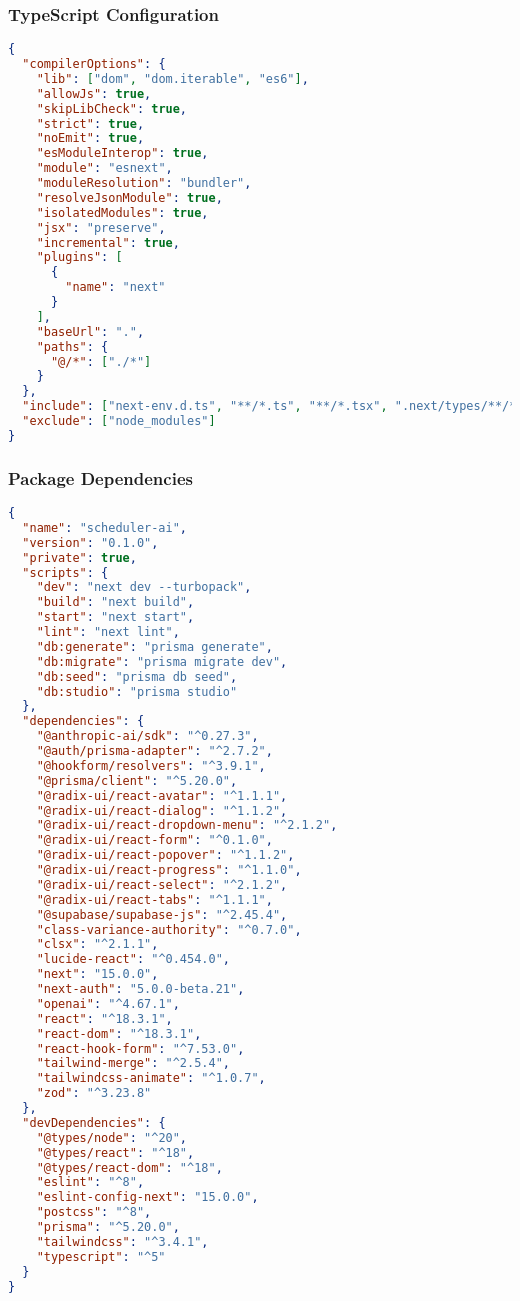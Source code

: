 \subsubsection{TypeScript Configuration}

\begin{lstlisting}[language=JSON, caption=tsconfig.json]
{
  "compilerOptions": {
    "lib": ["dom", "dom.iterable", "es6"],
    "allowJs": true,
    "skipLibCheck": true,
    "strict": true,
    "noEmit": true,
    "esModuleInterop": true,
    "module": "esnext",
    "moduleResolution": "bundler",
    "resolveJsonModule": true,
    "isolatedModules": true,
    "jsx": "preserve",
    "incremental": true,
    "plugins": [
      {
        "name": "next"
      }
    ],
    "baseUrl": ".",
    "paths": {
      "@/*": ["./*"]
    }
  },
  "include": ["next-env.d.ts", "**/*.ts", "**/*.tsx", ".next/types/**/*.ts"],
  "exclude": ["node_modules"]
}
\end{lstlisting}

\subsubsection{Package Dependencies}

\begin{lstlisting}[language=JSON, caption=package.json - Key Dependencies]
{
  "name": "scheduler-ai",
  "version": "0.1.0",
  "private": true,
  "scripts": {
    "dev": "next dev --turbopack",
    "build": "next build",
    "start": "next start",
    "lint": "next lint",
    "db:generate": "prisma generate",
    "db:migrate": "prisma migrate dev",
    "db:seed": "prisma db seed",
    "db:studio": "prisma studio"
  },
  "dependencies": {
    "@anthropic-ai/sdk": "^0.27.3",
    "@auth/prisma-adapter": "^2.7.2",
    "@hookform/resolvers": "^3.9.1",
    "@prisma/client": "^5.20.0",
    "@radix-ui/react-avatar": "^1.1.1",
    "@radix-ui/react-dialog": "^1.1.2",
    "@radix-ui/react-dropdown-menu": "^2.1.2",
    "@radix-ui/react-form": "^0.1.0",
    "@radix-ui/react-popover": "^1.1.2",
    "@radix-ui/react-progress": "^1.1.0",
    "@radix-ui/react-select": "^2.1.2",
    "@radix-ui/react-tabs": "^1.1.1",
    "@supabase/supabase-js": "^2.45.4",
    "class-variance-authority": "^0.7.0",
    "clsx": "^2.1.1",
    "lucide-react": "^0.454.0",
    "next": "15.0.0",
    "next-auth": "5.0.0-beta.21",
    "openai": "^4.67.1",
    "react": "^18.3.1",
    "react-dom": "^18.3.1",
    "react-hook-form": "^7.53.0",
    "tailwind-merge": "^2.5.4",
    "tailwindcss-animate": "^1.0.7",
    "zod": "^3.23.8"
  },
  "devDependencies": {
    "@types/node": "^20",
    "@types/react": "^18",
    "@types/react-dom": "^18",
    "eslint": "^8",
    "eslint-config-next": "15.0.0",
    "postcss": "^8",
    "prisma": "^5.20.0",
    "tailwindcss": "^3.4.1",
    "typescript": "^5"
  }
}
\end{lstlisting}

